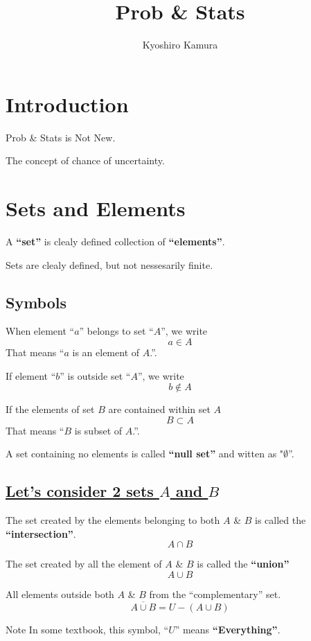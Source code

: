 \documentclass[autodetect-engine]{jsarticle}
\title{Prob \& Stats}
\author{Kyoshiro Kamura}
\date{\fulltoday}
\begin{document}
\maketitle

{\fontsize{10.5bp}{16.8bp}\selectfont
  \section{Introduction}
  Prob \& Stats is Not New.
  
  The concept of chance of uncertainty.
  
  \section{Sets and Elements}
  A \textbf{``set''} is clealy defined collection of \textbf{``elements''}.

  Sets are clealy defined, but not nessesarily finite.

  \subsection{Symbols}
  When element ``$a$'' belongs to set ``$A$'', we write
  \[
  a \in A
  \]
  That means ``$a$ is an element of $A$.''.

  If element ``$b$'' is outside set ``$A$'', we write
  \[
  b \notin A
  \]

  If the elements of set $B$ are contained within set $A$
  \[
  B \subset A
  \]
  That means ``$B$ is subset of $A$.''.

  A set containing no elements is called \textbf{``null set''}
  and witten as "$\emptyset$''.

  \subsection*{\underline{Let's consider 2 sets $A$ and $B$}}
  The set created by the elements belonging to both $A$ \& $B$ is called the \textbf{``intersection''}.
  \[
  A \cap B
  \]

  The set created by all the element of $A$ \& $B$ is called the \textbf{``union''}
  \[
  A \cup B
  \]

  All elements outside both $A$ \& $B$ from the ``complementary'' set.
  \[
  \overline{A \cup B} = U - (A \cup B)
  \]
  \begin{itembox}[l]{Note}
    In some textbook, this symbol, ``$U$'' means \textbf{``Everything''}.
  \end{itembox}

}
\end{document}
